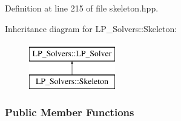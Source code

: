 Definition at line 215 of file skeleton.\+hpp.

Inheritance diagram for L\+P\+\_\+\+Solvers\+:\+:Skeleton\+:\begin{figure}[H]
\begin{center}
\leavevmode
\includegraphics[height=2.000000cm]{group___c_l_s_solvers}
\end{center}
\end{figure}
\subsubsection*{Public Member Functions}
